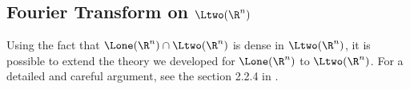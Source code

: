 \subsection{Fourier Transform on $\Ltwo(\R^n)$}

Using the fact that $\Lone(\R^n) \cap \Ltwo(\R^n)$ is dense in $\Ltwo(\R^n)$, it is possible to extend the theory we developed for $\Lone(\R^n)$ to $\Ltwo(\R^n)$. For a detailed and careful argument, see the section 2.2.4 in \cite{loukasgrafakos_2014_classical}.